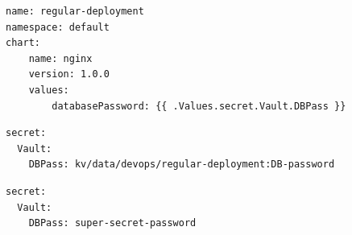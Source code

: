 \begin{lstlisting}[frame=single,caption={Contoh penggunaan \textit{secret} pada template},label={code:secretTemplate}]
name: regular-deployment
namespace: default
chart:
    name: nginx
    version: 1.0.0
    values:
        databasePassword: {{ .Values.secret.Vault.DBPass }}
\end{lstlisting}

\begin{lstlisting}[frame=single,caption={Contoh penggunaan \textit{secret} pada nilai yang dipakai},label={code:secretValue}]
secret:
  Vault:
    DBPass: kv/data/devops/regular-deployment:DB-password
\end{lstlisting}

\begin{lstlisting}[frame=single,caption={Contoh penggunaan \textit{secret} pada nilai yang dipakai},label={code:secretFinal}]
secret:
  Vault:
    DBPass: super-secret-password
\end{lstlisting}


